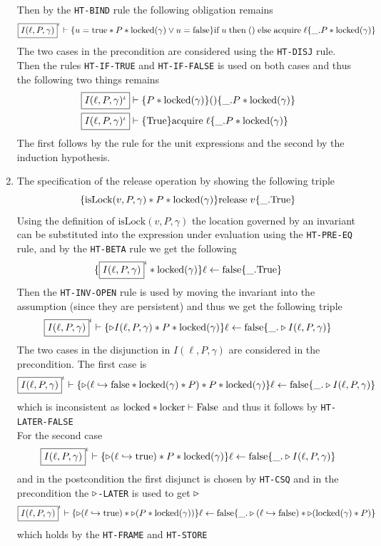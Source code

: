 \begin{enumerate}
  Then by the \texttt{HT-BIND} rule the following obligation remains
  \[
    \fbox{\ensuremath{I(\ell,P,\gamma)}}^\iota \vdash \{u = \text{true} * P * \text{locked}(\gamma) \lor u = \text{false}\} \text{if} \; u \; \text{then} \; () \; \text{else} \; \text{acquire} \; \ell \{\_.P*\text{locked}(\gamma)\}
  \]
  The two cases in the precondition are considered using the \texttt{HT-DISJ} rule. Then the rules \texttt{HT-IF-TRUE} and \texttt{HT-IF-FALSE} is used on both cases and thus the following two things remains
  \begin{align*}
    &\fbox{\ensuremath{I(\ell, P, \gamma)^\iota}} \vdash \{P * \text{locked}(\gamma)\} () \{\_. P * \text{locked}(\gamma)\} \\
    &\fbox{\ensuremath{I(\ell, P, \gamma)^\iota}} \vdash \{\text{True}\} \text{acquire} \; \ell \{\_. P * \text{locked}(\gamma)\} \\
  \end{align*}
  The first follows by the rule for the unit expressions and the second by the induction hypothesis. 
  \item The specification of the release operation by showing the following triple
  \[
    \{\text{isLock}(v,P, \gamma) * P * \text{locked}(\gamma)\} \text{release} \; v \{\_. \text{True}\}
  \]
  Using the definition of $\text{isLock}(v,P,\gamma)$ the location governed by an invariant can be substituted into the expression under evaluation using the \texttt{HT-PRE-EQ} rule, and by the \texttt{HT-BETA} rule we get the following
  \[
    \{\fbox{\ensuremath{I(\ell, P, \gamma)}}^\iota * \text{locked}(\gamma)\} \ell \leftarrow \text{false} \{\_. \text{True}\}
  \]
  Then the \texttt{HT-INV-OPEN} rule is used by moving the invariant into the assumption (since they are persistent) and thus we get the following triple
  \[
    \fbox{\ensuremath{I(\ell, P, \gamma)}}^\iota \vdash \{\triangleright I(\ell, P, \gamma) * P * \text{locked}(\gamma)\} \ell \leftarrow \text{false} \{\_. \triangleright I(\ell, P, \gamma)\}
  \]
  The two cases in the disjunction in $I(\ell, P, \gamma)$ are considered in the precondition. The first case is 
  \[
    \fbox{\ensuremath{I(\ell, P, \gamma)}}^\iota \vdash \{\triangleright (\ell \hookrightarrow \text{false} * \text{locked}(\gamma) * P) * P * \text{locked}(\gamma)\} \ell \leftarrow \text{false} \{\_. \triangleright I(\ell, P, \gamma)\}
  \]
  which is inconsistent as $\text{locked} * \text{locker} \vdash \text{False}$ and thus it follows by \texttt{HT-LATER-FALSE} \smallskip \\
  For the second case
  \[
    \fbox{\ensuremath{I(\ell, P, \gamma)}}^\iota \vdash \{\triangleright (\ell \hookrightarrow \text{true}) * P * \text{locked}(\gamma)\} \ell \leftarrow \text{false} \{\_. \triangleright I(\ell, P, \gamma)\}
  \]
  and in the postcondition the first disjunct is chosen by \texttt{HT-CSQ} and in the precondition the $\triangleright$\texttt{-LATER} is used to get $\triangleright$ 
  \[
    \fbox{\ensuremath{I(\ell, P, \gamma)}}^\iota \vdash \{\triangleright (\ell \hookrightarrow \text{true}) * \triangleright (P * \text{locked}(\gamma))\} \ell \leftarrow \text{false} \{\_. \triangleright (\ell \hookrightarrow \text{false}) * \triangleright(\text{locked}(\gamma) * P)\}
  \]
  which holds by the \texttt{HT-FRAME} and \texttt{HT-STORE}
\end{enumerate}


\newpage
